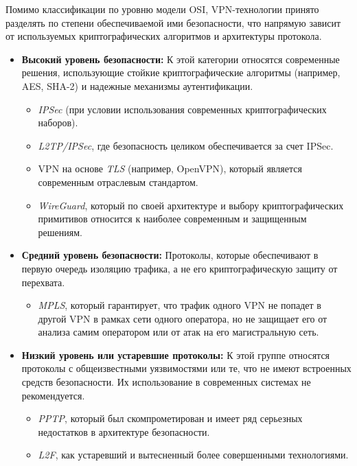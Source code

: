 Помимо классификации по уровню модели OSI, VPN-технологии принято разделять по степени обеспечиваемой ими безопасности, что напрямую зависит от используемых криптографических алгоритмов и архитектуры протокола.

\begin{itemize}
    \item \textbf{Высокий уровень безопасности:} К этой категории относятся современные решения, использующие стойкие криптографические алгоритмы (например, AES, SHA-2) и надежные механизмы аутентификации.
    \begin{itemize}
        \item \textit{IPSec} (при условии использования современных криптографических наборов).
        \item \textit{L2TP/IPSec}, где безопасность целиком обеспечивается за счет IPSec.
        \item VPN на основе \textit{TLS} (например, OpenVPN), который является современным отраслевым стандартом.
        \item \textit{WireGuard}, который по своей архитектуре и выбору криптографических примитивов относится к наиболее современным и защищенным решениям.
    \end{itemize}

    \item \textbf{Средний уровень безопасности:} Протоколы, которые обеспечивают в первую очередь изоляцию трафика, а не его криптографическую защиту от перехвата.
    \begin{itemize}
        \item \textit{MPLS}, который гарантирует, что трафик одного VPN не попадет в другой VPN в рамках сети одного оператора, но не защищает его от анализа самим оператором или от атак на его магистральную сеть.
    \end{itemize}

    \item \textbf{Низкий уровень или устаревшие протоколы:} К этой группе относятся протоколы с общеизвестными уязвимостями или те, что не имеют встроенных средств безопасности. Их использование в современных системах не рекомендуется.
    \begin{itemize}
        \item \textit{PPTP}, который был скомпрометирован и имеет ряд серьезных недостатков в архитектуре безопасности.
        \item \textit{L2F}, как устаревший и вытесненный более совершенными технологиями.
    \end{itemize}
\end{itemize}

